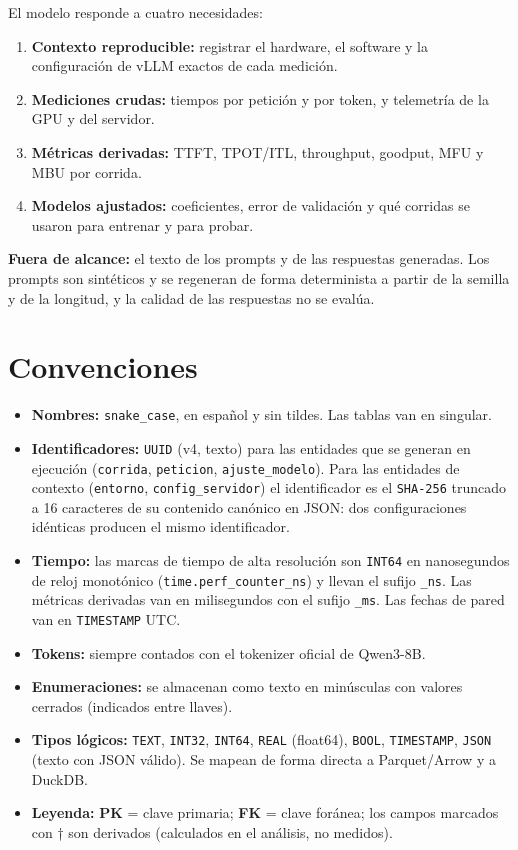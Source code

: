 \documentclass[11pt,a4paper]{article}
\newcommand{\PK}{\textcolor{pkc}{\textbf{PK}}}
\newcommand{\FK}{\textcolor{fkc}{\textbf{FK}}}
\newcommand{\campo}[1]{\texttt{#1}}
\begin{document}
El modelo responde a cuatro necesidades:
\begin{enumerate}[nosep]
  \item \textbf{Contexto reproducible:} registrar el hardware, el software y la configuración de vLLM exactos de cada medición.
  \item \textbf{Mediciones crudas:} tiempos por petición y por token, y telemetría de la GPU y del servidor.
  \item \textbf{Métricas derivadas:} TTFT, TPOT/ITL, throughput, goodput, MFU y MBU por corrida.
  \item \textbf{Modelos ajustados:} coeficientes, error de validación y qué corridas se usaron para entrenar y para probar.
\end{enumerate}

\textbf{Fuera de alcance:} el texto de los prompts y de las respuestas generadas. Los prompts son sintéticos y se regeneran de forma determinista a partir de la semilla y de la longitud, y la calidad de las respuestas no se evalúa.

\section{Convenciones}
\begin{itemize}[nosep]
  \item \textbf{Nombres:} \texttt{snake_case}, en español y sin tildes. Las tablas van en singular.
  \item \textbf{Identificadores:} \texttt{UUID} (v4, texto) para las entidades que se generan en ejecución (\campo{corrida}, \campo{peticion}, \campo{ajuste_modelo}). Para las entidades de contexto (\campo{entorno}, \campo{config_servidor}) el identificador es el \texttt{SHA-256} truncado a 16 caracteres de su contenido canónico en JSON: dos configuraciones idénticas producen el mismo identificador.
  \item \textbf{Tiempo:} las marcas de tiempo de alta resolución son \texttt{INT64} en nanosegundos de reloj monotónico (\texttt{time.perf_counter_ns}) y llevan el sufijo \texttt{_ns}. Las métricas derivadas van en milisegundos con el sufijo \texttt{_ms}. Las fechas de pared van en \texttt{TIMESTAMP} UTC.
  \item \textbf{Tokens:} siempre contados con el tokenizer oficial de Qwen3-8B.
  \item \textbf{Enumeraciones:} se almacenan como texto en minúsculas con valores cerrados (indicados entre llaves).
  \item \textbf{Tipos lógicos:} \texttt{TEXT}, \texttt{INT32}, \texttt{INT64}, \texttt{REAL} (float64), \texttt{BOOL}, \texttt{TIMESTAMP}, \texttt{JSON} (texto con JSON válido). Se mapean de forma directa a Parquet/Arrow y a DuckDB.
  \item \textbf{Leyenda:} \PK{} = clave primaria; \FK{} = clave foránea; los campos marcados con † son derivados (calculados en el análisis, no medidos).
\end{itemize}
\end{document}
